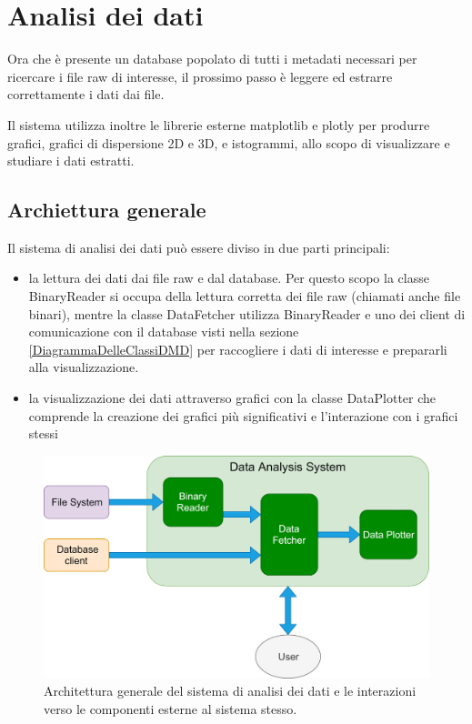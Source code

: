\chapter{Analisi dei dati}
\label{AnalisiDeiDati}
Ora che è presente un database popolato di tutti i metadati necessari per ricercare i file raw di interesse, il prossimo passo è leggere ed estrarre correttamente i dati dai file.

Il sistema utilizza inoltre le librerie esterne matplotlib\cite{matplotlib} e plotly\cite{plotly} per produrre grafici, grafici di dispersione 2D e 3D, e istogrammi, allo scopo di visualizzare e studiare i dati estratti.

\section{Archiettura generale}

Il sistema di analisi dei dati può essere diviso in due parti principali:

\begin{itemize}
	\item la lettura dei dati dai file raw e dal database. Per questo scopo la classe BinaryReader si occupa della lettura corretta dei file raw (chiamati anche file binari), mentre la classe DataFetcher utilizza BinaryReader e uno dei client di comunicazione con il database visti nella sezione \ref{DiagrammaDelleClassiDMD} per raccogliere i dati di interesse e prepararli alla visualizzazione.
	\item la visualizzazione dei dati attraverso grafici con la classe DataPlotter che comprende la creazione dei grafici più significativi e l'interazione con i grafici stessi
\end{itemize}

\begin{figure}
	\includegraphics[width=\textwidth]{figures/ArchitetturaDA}
	\caption[Architettura del sistema di analisi dei dati]{ Architettura generale del sistema di analisi dei dati  e le interazioni verso le componenti esterne al sistema stesso.
		\label{fig:ArchitetturaDA}}
\end{figure}


